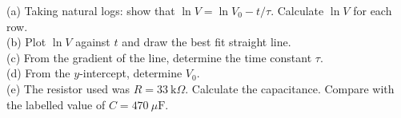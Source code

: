 \begin{exercisebox}[22]
(a) Taking natural logs: show that
$\ln V = \ln V_0 - t/\tau$.
Calculate $\ln V$ for each row.\\
(b) Plot $\ln V$ against $t$ and draw the best
fit straight line.\\
(c) From the gradient of the line, determine
the time constant $\tau$.\\
(d) From the $y$-intercept, determine $V_0$.\\
(e) The resistor used was $R = 33\ \text{k}\Omega$.
Calculate the capacitance. Compare with the labelled
value of $C = 470\ \mu\text{F}$.
\hfill{}

\end{exercisebox}
